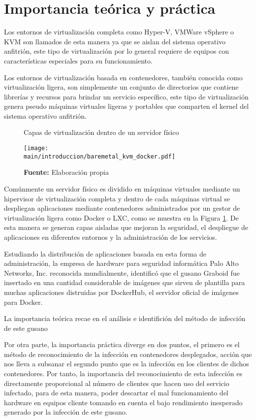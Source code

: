 \documentclass[../main/main.tex]{subfiles}
\begin{document}
  \section{Importancia teórica y práctica}

  Los entornos de virtualización completa como Hyper-V, VMWare vSphere o KVM son llamados de esta manera ya que se aislan del sistema operativo anfitrión, este tipo de virtualización por lo general requiere de equipos con características especiales para su funcionamiento.

  Los entornos de virtualización basada en contenedores, también conocida como virtualización ligera, son simplemente un conjunto de directorios que contiene librerías y recursos para brindar un servicio específico, este tipo de virtualización genera pseudo máquinas virtuales ligeras y portables que comparten el kernel del sistema operativo anfitrión.

  \begin{figure}[ht]
    \centering
    \caption{Capas de virtualización dentro de un servidor físico}
    \texttt{[image: \\main/introduccion/baremetal\_kvm\_docker.pdf]}
    \caption*{\textbf{Fuente:} Elaboración propia}
    \label{fig:baremetal_kvm_docker}
  \end{figure}

  Comúnmente un servidor físico es dividido en máquinas virtuales mediante un hipervisor de virtualización completa y dentro de cada máquinas virtual se despliegan aplicaciones mediante contenedores administrados por un gestor de virtualización ligera como Docker o LXC, como se muestra en la Figura \ref{fig:baremetal_kvm_docker}. De esta manera se generan capas aisladas que mejoran la seguridad, el despliegue de aplicaciones en diferentes entornos y la administración de los servicios.

  Estudiando la distribución de aplicaciones basada en esta forma de administración, la empresa de hardware para seguridad informática  Palo Alto Networks, Inc. reconocida mundialmente, identificó que el gusano Graboid fue insertado en una cantidad considerable de imágenes que sirven de plantilla para muchas aplicaciones distruidas por DockerHub, el servidor oficial de imágenes para Docker.

  La importancia teórica recae en el análisis e identifición del método de infección de este gusano

  Por otra parte, la importancia práctica diverge en dos puntos, el primero es el método de reconocimiento de la infección en contenedores desplegados, acción que nos lleva a subsanar el segundo punto que es la infección en los clientes de dichos contenedores. Por tanto, la importancia del reconocimiento de esta infección es directamente proporcional al número de clientes que hacen uso del servicio infectado, para de esta manera, poder descartar el mal funcionamiento del hardware en equipos cliente tomando en cuenta el bajo rendimiento inesperado generado por la infección de este gusano.
\end{document}
